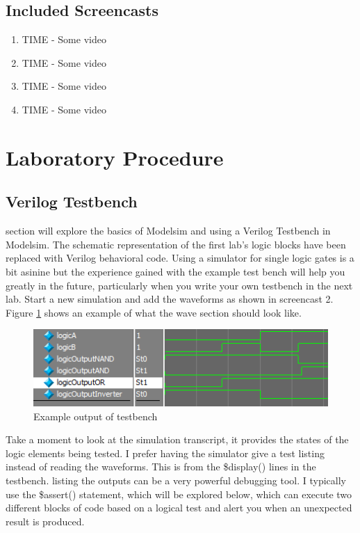     \subsection{Included Screencasts}
      \begin{enumerate}
        \item TIME - Some video
        \item TIME - Some video
        \item TIME - Some video
        \item TIME - Some video
      \end{enumerate}

  \section{Laboratory Procedure}
  \subsection{Verilog Testbench}
     section will explore the basics of Modelsim and using a Verilog Testbench in Modelsim. The schematic representation of the first lab's logic blocks have been replaced with Verilog behavioral code. Using a simulator for single logic gates is a bit asinine but the experience gained with the example test bench will help you greatly in the future, particularly when you write your own testbench in the next lab. Start a new simulation and add the waveforms as shown in screencast 2. Figure \ref{LogicOut} shows an example of what the wave section should look like. 
    \begin{figure}[H]
      \label{LogicOut}
      \includegraphics[width=.48\textwidth]{Images/LogicOutput.png}
      \caption{Example output of testbench}
    \end{figure}

    Take a moment to look at the simulation transcript, it provides the states of the logic elements being tested.
    I prefer having the simulator give a test listing instead of reading the waveforms. This is from the \$display()
    lines in the testbench. listing the outputs can be a very powerful debugging tool. I typically use the \$assert()
    statement, which will be explored below, which can execute two different blocks of code based on a logical test and alert you when an unexpected result is produced.
    


